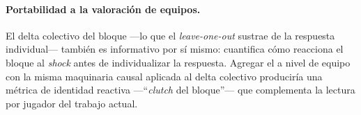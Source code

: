 \paragraph{Portabilidad a la valoración de equipos.}
El delta colectivo del bloque ---lo que el \textit{leave-one-out}
sustrae de la respuesta individual--- también es informativo por sí
mismo: cuantifica cómo reacciona el bloque al \textit{shock} antes
de individualizar la respuesta. Agregar el \CCV a nivel de equipo
con la misma maquinaria causal aplicada al delta colectivo
produciría una métrica de identidad reactiva
---``\textit{clutch} del bloque''--- que complementa la lectura por
jugador del trabajo actual.
